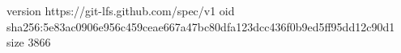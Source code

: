 version https://git-lfs.github.com/spec/v1
oid sha256:5e83ac0906e956c459ceae667a47bc80dfa123dcc436f0b9ed5ff95dd12c90d1
size 3866
